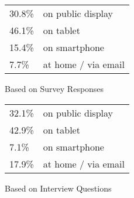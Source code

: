 

\begin{subtable}[b]{0.5\textwidth}
    \begin{tabular}{ll}
    \toprule
    30.8\%       & on public display     \\
    46.1\%       & on tablet         \\
    15.4\%       &  on smartphone          \\
    7.7\%        &  at home / via email        \\
    \bottomrule
    \end{tabular}        \caption{Based on Survey Responses}
\end{subtable}


\begin{subtable}[b]{0.5\textwidth}
    \begin{tabular}{ll}
    \toprule
    32.1\%       & on public display     \\
    42.9\%       & on tablet         \\
    7.1\%       &  on smartphone          \\
    17.9\%        &  at home / via email        \\
    \bottomrule
    \end{tabular}        \caption{Based on Interview Questions}
\end{subtable}

